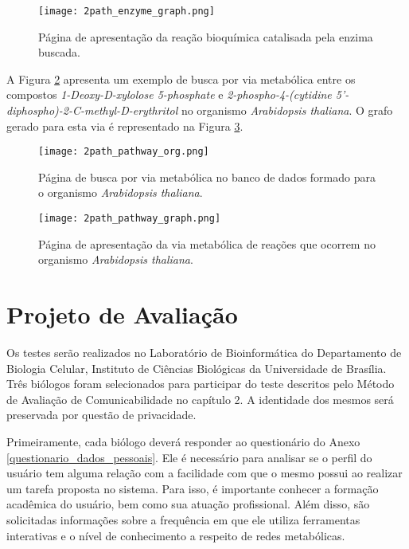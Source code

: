 \begin{figure}[!h]
    \centering
    \texttt{[image: 2path\_enzyme\_graph.png]}
    \caption{Página de apresentação da reação bioquímica catalisada pela enzima buscada.}
    \label{fig:2path_enzyme_graph}
\end{figure}

\indent A Figura \ref{fig:2path_pathway_org} apresenta um exemplo de busca por via metabólica entre os compostos \textit{1-Deoxy-D-xylolose 5-phosphate} e \textit{2-phospho-4-(cytidine 5'-diphospho)-2-C-methyl-D-erythritol} no organismo \textit{Arabidopsis thaliana}. O grafo gerado para esta via é representado na Figura \ref{fig:2path_pathway_graph}.

\begin{figure}[!h]
    \centering
    \texttt{[image: 2path\_pathway\_org.png]}
    \caption{Página de busca por via metabólica no banco de dados formado para o organismo \textit{Arabidopsis thaliana}.}
    \label{fig:2path_pathway_org}
\end{figure}

\begin{figure}[!h]
    \centering
    \texttt{[image: 2path\_pathway\_graph.png]}
    \caption{Página de apresentação da via metabólica de reações que ocorrem no organismo \textit{Arabidopsis thaliana}.}
    \label{fig:2path_pathway_graph}
\end{figure}

\section{Projeto de Avaliação} \label{avaliacao}

\indent Os testes serão realizados no Laboratório de Bioinformática do Departamento de Biologia Celular, Instituto de Ciências Biológicas da Universidade de Brasília. Três biólogos foram selecionados para participar do teste descritos pelo Método de Avaliação de Comunicabilidade no capítulo 2. A identidade dos mesmos será preservada por questão de privacidade.

\indent Primeiramente, cada biólogo deverá responder ao questionário do Anexo \ref{questionario_dados_pessoais}. Ele é necessário para analisar se o perfil do usuário tem alguma relação com a facilidade com que o mesmo possui ao realizar um tarefa proposta no sistema. Para isso, é importante conhecer a formação acadêmica do usuário, bem como sua atuação profissional. Além disso, são solicitadas informações sobre a frequência em que ele utiliza ferramentas interativas e o nível de conhecimento a respeito de redes metabólicas. 

